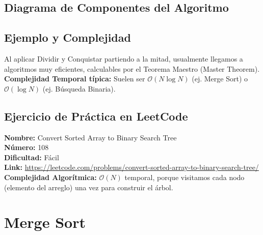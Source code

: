 \documentclass[12pt]{article}
\begin{document}
\subsection{Diagrama de Componentes del Algoritmo}
\begin{center}
\end{center}

\subsection{Ejemplo y Complejidad}
Al aplicar Dividir y Conquistar partiendo a la mitad, usualmente llegamos a algoritmos muy eficientes, calculables por el Teorema Maestro (Master Theorem).
\textbf{Complejidad Temporal típica:} Suelen ser $\mathcal{O}(N \log N)$ (ej. Merge Sort) o $\mathcal{O}(\log N)$ (ej. Búsqueda Binaria).

\subsection{Ejercicio de Práctica en LeetCode}
\textbf{Nombre:} Convert Sorted Array to Binary Search Tree \\
\textbf{Número:} 108 \\
\textbf{Dificultad:} Fácil \\
\textbf{Link:} \url{https://leetcode.com/problems/convert-sorted-array-to-binary-search-tree/} \\
\textbf{Complejidad Algorítmica:} $\mathcal{O}(N)$ temporal, porque visitamos cada nodo (elemento del arreglo) una vez para construir el árbol.

\newpage
\section{Merge Sort}
\end{document}
